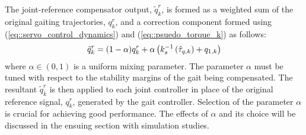 The joint-reference compensator output, $\tilde{q}_{k}^{r}$, is formed as a weighted sum of the original gaiting trajectories, ${q}_{k}^{r}$, and a correction component formed using (\ref{eq::servo_control_dynamics}) and (\ref{eq::psuedo_torque_k}) as follows:
	\vspace{-1.5mm}
	\begin{equation}
		\vspace{-1mm}
	 	\tilde{q}_{k}^{r} 	= (1-\alpha) {q}_{k}^{r} + \alpha \left( k_{s}^{-1}  \left(  \hat{\tau}_{q,k}  \right) +  {q}_{1,k} \right)
		\label{eq::correction_application}
	\end{equation}
where  $\alpha \in (0,1)$ is a uniform mixing parameter. The parameter $\alpha$ must be tuned with respect to the stability margins of the gait being compensated. The resultant $\tilde{q}_{k}^{r}$ is then applied  to each joint controller in place of the original reference signal,  ${q}_{k}^{r}$, generated by the gait controller. Selection of the parameter $\alpha$ is crucial for achieving good performance. The effects of $\alpha$ and its choice will be discussed in the ensuing section with simulation studies. 
\vspace{-2mm}
